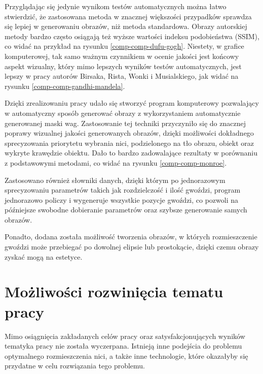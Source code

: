     Przyglądając się jedynie wynikom testów automatycznych można łatwo stwierdzić, że zastosowana metoda w znacznej większości przypadków sprawdza się lepiej w generowaniu obrazów, niż metoda standardowa. Obrazy autorskiej metody bardzo często osiągają też wyższe wartości indeksu podobieństwa (SSIM), co widać na przykład na rysunku \ref{comp-comp-dufu-gogh}. Niestety, w grafice komputerowej, tak samo ważnym czynnikiem w ocenie jakości jest końcowy aspekt wizualny, który mimo lepszych wyników testów automatycznych, jest lepszy w pracy autorów Birsaka, Rista, Wonki i Musialskiego, jak widać na rysunku \ref{comp-comp-gandhi-mandela}.
    
    Dzięki zrealizowaniu pracy udało się stworzyć program komputerowy pozwalający w automatyczny sposób generować obrazy z wykorzystaniem automatycznie generowanej maski wag. Zastosowanie tej techniki przyczyniło się do znacznej poprawy wizualnej jakości generowanych obrazów, dzięki możliwości dokładnego sprecyzowania priorytetu wybrania nici, podzielonego na tło obrazu, obiekt oraz wykryte krawędzie obiektu. Dało to bardzo zadowalające rezultaty w porównaniu z podstawowymi metodami, co widać na rysunku \ref{comp-comp-monroe}. 
    
    Zastosowano również słowniki danych, dzięki którym po jednorazowym sprecyzowaniu parametrów takich jak rozdzielczość i ilość gwoździ, program jednorazowo policzy i wygeneruje wszystkie pozycje gwoździ, co pozwoli na późniejsze swobodne dobieranie parametrów oraz szybsze generowanie samych obrazów.
    
    Ponadto, dodana została możliwość tworzenia obrazów, w których rozmieszczenie gwoździ może przebiegać po dowolnej elipsie lub prostokącie, dzięki czemu obrazy zyskać mogą na estetyce.
    
    \section{Możliwości rozwinięcia tematu pracy}
    Mimo osiągnięcia zakładanych celów pracy oraz satysfakcjonujących wyników tematyka pracy nie została wyczerpana. Istnieją inne podejścia do problemu optymalnego rozmieszczenia nici, a także inne technologie, które okazałyby się przydatne w celu rozwiązania tego problemu. 
    
